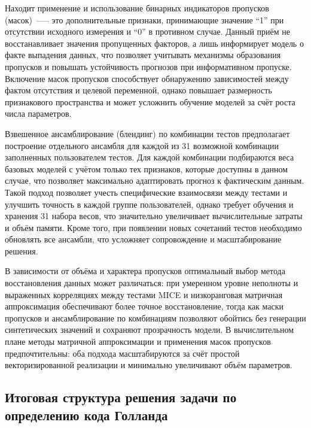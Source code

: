 Находит применение и использование бинарных индикаторов пропусков (масок)~--— это дополнительные признаки, принимающие значение \enquote{1} при отсутствии исходного измерения и \enquote{0} в противном случае. Данный приём не восстанавливает значения пропущенных факторов, а лишь информирует модель о факте выпадения данных, что позволяет учитывать механизмы образования пропусков и повышать устойчивость прогнозов при информативном пропуске. Включение масок пропусков способствует обнаружению зависимостей между фактом отсутствия и целевой переменной, однако повышает размерность признакового пространства и может усложнить обучение моделей за счёт роста числа параметров.

Взвешенное ансамблирование (блендинг) по комбинации тестов предполагает построение отдельного ансамбля для каждой из 31 возможной комбинации заполненных пользователем тестов. Для каждой комбинации подбираются веса базовых моделей с учётом только тех признаков, которые доступны в данном случае, что позволяет максимально адаптировать прогноз к фактическим данным. Такой подход позволяет учесть специфические взаимосвязи между тестами и улучшить точность в каждой группе пользователей, однако требует обучения и хранения 31 набора весов, что значительно увеличивает вычислительные затраты и объём памяти. Кроме того, при появлении новых сочетаний тестов необходимо обновлять все ансамбли, что усложняет сопровождение и масштабирование решения.

В зависимости от объёма и характера пропусков оптимальный выбор метода восстановления данных может различаться: при умеренном уровне неполноты и выраженных корреляциях между тестами MICE и низкоранговая матричная аппроксимация обеспечивают более точное восстановление, тогда как маски пропусков и ансамблирование по комбинациям позволяют обойтись без генерации синтетических значений и сохраняют прозрачность модели. В вычислительном плане методы матричной аппроксимации и применения масок пропусков предпочтительны: оба подхода масштабируются за счёт простой векторизированной реализации и минимально увеличивают объём параметров.


\subsection{Итоговая структура решения задачи по определению кода Голланда}

